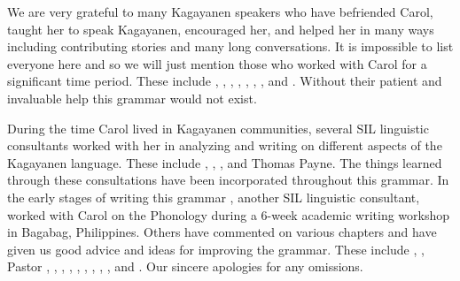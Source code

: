 \addchap{\lsAcknowledgementTitle} 

We are very grateful to many Kagayanen speakers who have befriended Carol, taught her to speak Kagayanen, encouraged her, and helped her in many ways including contributing stories and many long conversations. It is impossible to list everyone here and so we will just mention those who worked with Carol for a significant time period. These include , , , , , , , and . Without their patient and invaluable help this grammar would not exist. 

During the time Carol lived in Kagayanen communities, several SIL linguistic consultants worked with her in analyzing and writing on different aspects of the Kagayanen language. These include , , ,  and Thomas Payne. The things learned through these consultations have been incorporated throughout this grammar.
In the early stages of writing this grammar , another SIL linguistic consultant, worked with Carol on the Phonology during a 6-week academic writing workshop in Bagabag, Philippines. Others have commented on various chapters and have given us good advice and ideas for improving the grammar. These include , , Pastor , , , , , , , , , and . Our sincere apologies for any omissions. 

